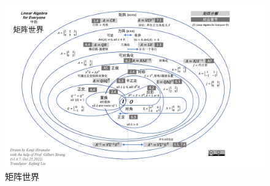 \documentclass[letterpaper]{article}
\begin{document}
\begin{enumerate}
\begin{figure}[H]
    \includegraphics[keepaspectratio, width=\linewidth]{MatrixWorld-zh-CN.png}
    \caption{矩阵世界}
  \end{figure}
\end{enumerate}
\end{document}
